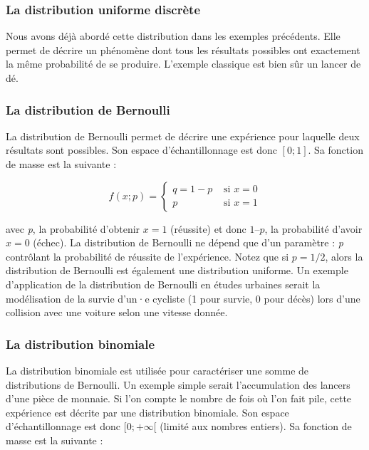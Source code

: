 \documentclass[
  11pt,
  french,
]{book}
\begin{document}
\hypertarget{la-distribution-uniforme-discruxe8te}{%
\subsubsection{La distribution uniforme discrète}\label{la-distribution-uniforme-discruxe8te}}

Nous avons déjà abordé cette distribution dans les exemples précédents. Elle permet de décrire un phénomène dont tous les résultats possibles ont exactement la même probabilité de se produire. L'exemple classique est bien sûr un lancer de dé.

\hypertarget{la-distribution-de-bernoulli}{%
\subsubsection{La distribution de Bernoulli}\label{la-distribution-de-bernoulli}}

La distribution de Bernoulli permet de décrire une expérience pour laquelle deux résultats sont possibles. Son espace d'échantillonnage est donc \([0 ; 1]\). Sa fonction de masse est la suivante :

\footnotesize

\begin{equation} f(x ; p)=\left\{\begin{array}{ll}
q=1-p & \text { si } x=0 \\
p & \text { si } x=1
\end{array}\right.
\label{eq:BernoulliB}
\end{equation}
\normalsize

avec \emph{p}, la probabilité d'obtenir \(x = 1\) (réussite) et donc \(1 – p\), la probabilité d'avoir \(x = 0\) (échec). La distribution de Bernoulli ne dépend que d'un paramètre : \emph{p} contrôlant la probabilité de réussite de l'expérience. Notez que si \(p = 1/2\), alors la distribution de Bernoulli est également une distribution uniforme. Un exemple d'application de la distribution de Bernoulli en études urbaines serait la modélisation de la survie d'un·e cycliste (1 pour survie, 0 pour décès) lors d'une collision avec une voiture selon une vitesse donnée.

\hypertarget{la-distribution-binomiale}{%
\subsubsection{La distribution binomiale}\label{la-distribution-binomiale}}

La distribution binomiale est utilisée pour caractériser une somme de distributions de Bernoulli. Un exemple simple serait l'accumulation des lancers d'une pièce de monnaie. Si l'on compte le nombre de fois où l'on fait pile, cette expérience est décrite par une distribution binomiale. Son espace d'échantillonnage est donc \([0 ; +\infty[\) (limité aux nombres entiers). Sa fonction de masse est la suivante :
\end{document}
